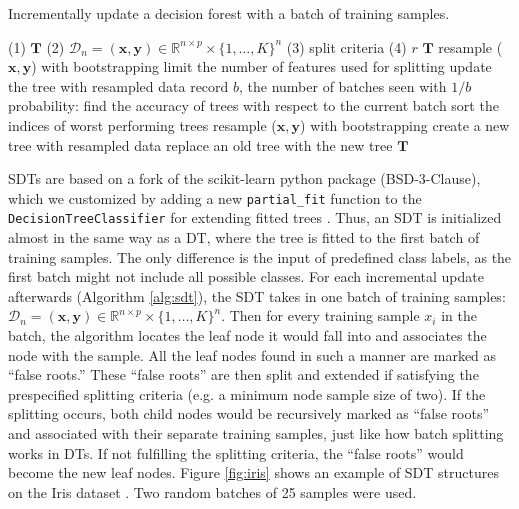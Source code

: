\begin{algorithm}[!htb]
\caption{Incrementally update a decision forest with a batch of training samples.}
\label{alg:sdf}
\begin{algorithmic}[1]
\Require
\Statex (1) $\mathbf{T}$ 
\Statex (2) $\mathcal{D}_n = (\mathbf{x},\mathbf{y}) \in \mathbb{R}^{n \times p} \times \{1,\ldots, K\}^n$ 
\Statex (3) split criteria 
\Statex (4) $r$ 
\Ensure
$\mathbf{T}$ 
\State resample ($\mathbf{x},\mathbf{y}$) with bootstrapping
\State limit the number of features used for splitting
\State update the tree with resampled data 
\EndFor
\State record $b$, the number of batches seen
with $1/b$ probability:
\State find the accuracy of trees with respect to the current batch
\State sort the indices of worst performing trees
\State resample ($\mathbf{x},\mathbf{y}$) with bootstrapping
\State create a new tree with resampled data
\State replace an old tree with the new tree 
\EndFor
\EndIf
\State \Return $\mathbf{T}$
\EndFunction
\end{algorithmic}
\end{algorithm}

SDTs are based on a fork
of the scikit-learn python package (BSD-3-Clause), which we customized by adding a new \texttt{partial\_fit} function to the \texttt{DecisionTreeClassifier} for extending fitted trees \citep{pedregosa_scikit-learn_2011}. Thus, an SDT is initialized almost in the same way as a DT, where the tree is fitted to the first batch of training samples. The only difference is the input of predefined class labels, as the first batch might not include all possible classes. 
For each incremental update afterwards (Algorithm \ref{alg:sdt}), the SDT takes in one batch of training samples: $\mathcal{D}_n = (\mathbf{x},\mathbf{y}) \in \mathbb{R}^{n \times p} \times \{1,\ldots, K\}^n$. 
Then for every training sample $x_i$ in the batch, the algorithm locates the leaf node it would fall into and associates the node with the sample. All the leaf nodes found in such a manner are marked as ``false roots.'' 
These ``false roots'' are then split and extended if satisfying the prespecified splitting criteria (e.g. a minimum node sample size of two). 
If the splitting occurs, both child nodes would be recursively marked as ``false roots'' and associated with their separate training samples, just like how batch splitting works in DTs. If not fulfilling the splitting criteria, the ``false roots'' would become the new leaf nodes. Figure \ref{fig:iris} shows an example of SDT structures on the Iris dataset \citep{fisher_uci_1988}. Two random batches of 25 samples were used.

